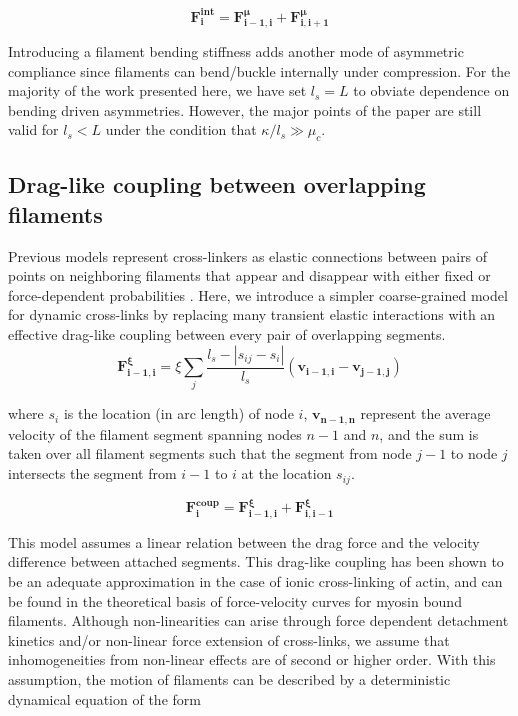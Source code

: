\documentclass[10pt,letterpaper]{article}
\begin{document}
\begin{equation}
\label{eqn:internal}
\mathbf{F^{int}_i} = \mathbf{F^{\mu}_{i-1,i}} + \mathbf{F^{\mu}_{i,i+1}} 
\end{equation}

Introducing a filament bending stiffness adds another mode of asymmetric compliance since filaments can bend/buckle internally under compression. For the majority of the work presented here, we have set $l_s=L$ to obviate dependence on bending driven asymmetries. However, the major points of the paper are still valid for $l_s<L$ under the condition that $\kappa/l_s\gg\mu_c$. 

\subsection*{Drag-like coupling between overlapping filaments}
\label{exp_drag}
Previous models represent cross-linkers as elastic connections between pairs of points on neighboring filaments that appear and disappear with either fixed or force-dependent probabilities \cite{model_taeyoon,theo_crosslinknonlinear}.  Here, we introduce a simpler coarse-grained model for dynamic cross-links by replacing many transient elastic interactions with an effective drag-like coupling between every pair of overlapping segments.
\begin{equation}
\label{eqn:drag}
\mathbf{F^{\xi}_{i-1,i}} = \xi \sum_j \frac{l_s-|s_{ij}-s_i|}{l_s}  (\mathbf{v_{i-1,i}}-\mathbf{v_{j-1,j}}) 
\end{equation}

where $s_i$ is the location (in arc length) of node $i$, $\mathbf{v_{n-1,n}}$ represent the average velocity of the filament segment spanning nodes $n-1$ and $n$, and the sum is taken over all filament segments such that the segment from node $j-1$ to node $j$ intersects the segment from $i-1$ to $i$ at the location $s_{ij}$.

\begin{equation}
\label{eqn:drag}
\mathbf{F^{coup}_{i}} = \mathbf{F^{\xi}_{i-1,i}} + \mathbf{F^{\xi}_{i,i-1}} 
\end{equation}

This model assumes a linear relation between the drag force and the velocity difference between attached segments.  This drag-like coupling has been shown to be an adequate approximation in the case of ionic cross-linking of actin\cite{mol_fric,theo_hydroish2}, and can be found in the theoretical basis of force-velocity curves for myosin bound filaments\cite{theo_frictionShila}. Although non-linearities can arise through force dependent detachment kinetics and/or non-linear force extension of cross-links, we assume that inhomogeneities from non-linear effects are of second or higher order. With this assumption, the motion of filaments can be described by a deterministic dynamical equation of the form
\end{document}
